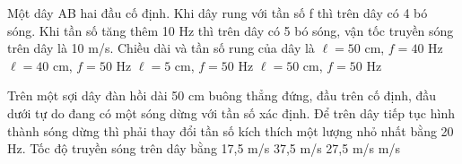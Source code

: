 \begin{vidu}%
Một dây AB hai đầu cố định. Khi dây rung với tần số f thì trên dây có 4 bó sóng. Khi tần số tăng thêm 10 Hz thì trên dây có 5 bó sóng, vận tốc truyền sóng trên dây là 10 m/s. Chiều dài và tần số rung của dây là
\choice
{\True $\ell=50$ cm, $f=40$ Hz}
{$\ell=40$ cm, $f=50$ Hz}
{$\ell=5$ cm, $f=50$ Hz}
{$\ell=50$ cm, $f=50$ Hz}
\end{vidu} 
\begin{vidu}%
Trên một sợi dây đàn hồi dài 50 cm buông thẳng đứng, đầu trên cố định, đầu dưới tự do đang có một sóng dừng với tần số xác định. Để trên dây tiếp tục hình thành sóng dừng thì phải thay đổi tần số kích thích một lượng nhỏ nhất bằng 20 Hz. Tốc độ truyền sóng trên dây bằng
\choice
{17,5 m/s}
{37,5 m/s}
{27,5 m/s}
{ m/s}
\end{vidu} 
